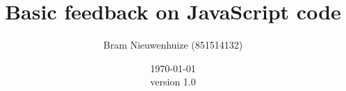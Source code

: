 \documentclass{article}
\begin{document}
 

\title{Basic feedback on JavaScript code} \author{Bram Nieuwenhuize (851514132)} 
\date{\today \\version 1.0} \maketitle 






\printglossaries
\end{document}
